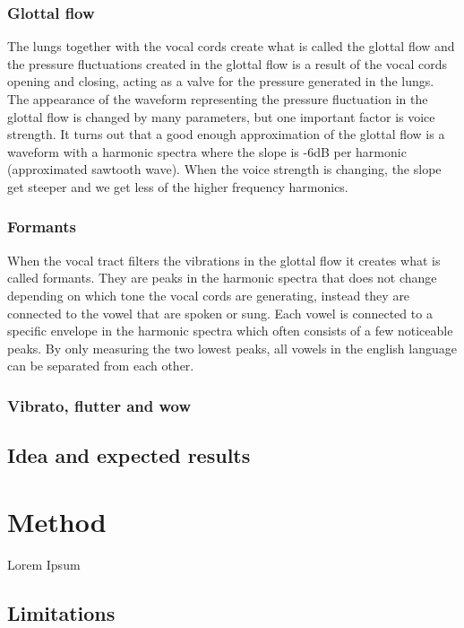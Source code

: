 \documentclass{article}
\begin{document}
\subsubsection{Glottal flow}
The lungs together with the vocal cords create what is called the glottal flow and the pressure fluctuations created in the glottal flow is a result of the vocal cords opening and closing, acting as a valve for the pressure generated in the lungs. The appearance of the waveform representing the pressure fluctuation in the glottal flow is changed by many parameters, but one important factor is voice strength. It turns out that a good enough approximation of the glottal flow is a waveform with a harmonic spectra where the slope is -6dB per harmonic (approximated sawtooth wave). When the voice strength is changing, the slope get steeper and we get less of the higher frequency harmonics.~\cite{ternstrom8:20, hall:91}

\subsubsection{Formants}
When the vocal tract filters the vibrations in the glottal flow it creates what is called formants. They are peaks in the harmonic spectra that does not change depending on which tone the vocal cords are generating, instead they are connected to the vowel that are spoken or sung. Each vowel is connected to a specific envelope in the harmonic spectra which often consists of a few noticeable peaks. By only measuring the two lowest peaks, all vowels in the english language can be separated from each other.~\cite{ternstrom8:20, hall:91}

\subsubsection{Vibrato, flutter and wow}


\subsection{Idea and expected results}


\section{Method}\label{sec:method}
Lorem Ipsum

\subsection{Limitations}
\end{document}
